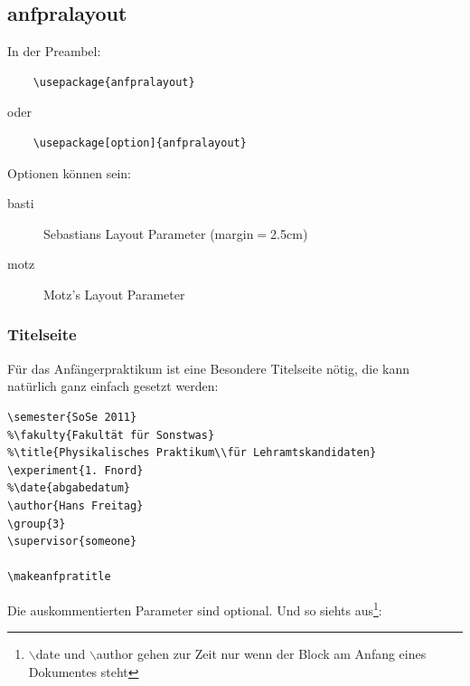 \documentclass[a4paper]{article}
\begin{document}
\subsection{anfpralayout}

In der Preambel:

\begin{verbatim}
	\usepackage{anfpralayout}
\end{verbatim}

oder

\begin{verbatim}
	\usepackage[option]{anfpralayout}
\end{verbatim}

Optionen können sein:

\begin{description}
	\item[basti] Sebastians Layout Parameter (margin$=$2.5cm)
	\item[motz] Motz's Layout Parameter
\end{description}


\subsubsection{Titelseite}

Für das Anfängerpraktikum ist eine Besondere Titelseite nötig, die
kann natürlich ganz einfach gesetzt werden:

\begin{verbatim}
\semester{SoSe 2011}
%\fakulty{Fakultät für Sonstwas}
%\title{Physikalisches Praktikum\\für Lehramtskandidaten}
\experiment{1. Fnord}
%\date{abgabedatum}
\author{Hans Freitag}
\group{3}
\supervisor{someone}

\makeanfpratitle
\end{verbatim}

Die auskommentierten Parameter sind optional. Und so siehts
aus\footnote{$\backslash$date und $\backslash$author gehen zur Zeit nur wenn der Block am
Anfang eines Dokumentes steht}:

\makeanfpratitle
\end{document}
